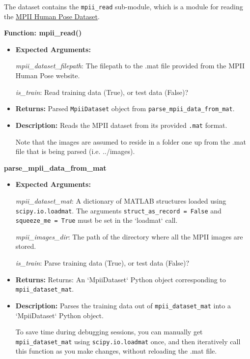 \documentclass{scrreprt}
\begin{document}
The dataset contains the \verb|mpii_read| sub-module, which is a module for
reading the \href{http://human-pose.mpi-inf.mpg.de/}{MPII Human Pose Dataset}.

\textbf{Function: mpii\_read()}

\begin{itemize}
        \item \textbf{Expected Arguments:}

        \textit{mpii\_dataset\_filepath}: The filepath to the .mat file provided from the
            MPII Human Pose website.

        \textit{is\_train}: Read training data (True), or test data (False)?

        \item \textbf{Returns:} Parsed \verb|MpiiDataset| object from
                \verb|parse_mpii_data_from_mat|.

        \item \textbf{Description:} Reads the MPII dataset from its provided
                \verb|.mat| format.

                Note that the images are assumed to reside in a folder one up from the .mat
                file that is being parsed (i.e. ../images).
\end{itemize}

\textbf{parse\_mpii\_data\_from\_mat}

\begin{itemize}
        \item \textbf{Expected Arguments:}

        \textit{mpii\_dataset\_mat}: A dictionary of MATLAB structures loaded using
            \verb|scipy.io.loadmat|. The arguments \verb|struct_as_record = False| and
            \verb|squeeze_me = True| must be set in the `loadmat` call.

        \textit{mpii\_images\_dir}: The path of the directory where all the
                MPII images are stored.

        \textit{is\_train}: Parse training data (True), or test data (False)?

        \item \textbf{Returns:} Returns: An `MpiiDataset` Python object
                corresponding to \verb|mpii_dataset_mat|.

        \item \textbf{Description:} Parses the training data out of
                \verb|mpii_dataset_mat| into a `MpiiDataset` Python object.

                To save time during debugging sessions, you can manually get
                \verb|mpii_dataset_mat| using \verb|scipy.io.loadmat| once, and
                then iteratively call this function as you make changes,
                without reloading the .mat file.
\end{itemize}
\end{document}
